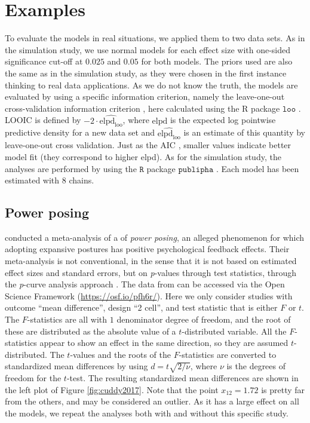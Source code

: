 \documentclass[preprint, authoryear]{elsarticle}
\theoremstyle{plain}
\theoremstyle{definition}
\begin{document}
\section{Examples}\label{sect:examples}
To evaluate the models in real situations, we applied them to two data sets. As in the simulation study, we use normal models for each effect size with one-sided significance cut-off at $0.025$ and $0.05$ for both models. The priors used are also the same as in the simulation study, as they were chosen in the first instance thinking to real data applications. As we do not know the truth, the models are evaluated by using a specific information criterion, namely the leave-one-out cross-validation information criterion \citet[LOOIC][]{loo_article}, here calculated using the R \citep{R} package $\mathtt{loo}$ \citep{loo}. LOOIC is defined by $-2\cdot\widehat{\text{elpd}_{\text{loo}}}$, where $\text{elpd}$ is the expected log pointwise predictive density for a new data set and $\widehat{\textrm{elpd}_{\textrm{loo}}}$ is an estimate of this quantity by leave-one-out cross validation. Just as the AIC \citep{akaike1998information}, smaller values indicate better model fit (they correspond to higher elpd). As for the simulation study, the analyses are performed by using the $\mathtt{R}$ package $\mathtt{publipha}$ \citep{publipha}. Each model has been estimated with $8$ chains.

\subsection{Power posing\label{subsec:cuddy2018}}

\citet{cuddy2018p} conducted a meta-analysis of a of \emph{power posing}, an alleged phenomenon for which adopting expansive postures has positive psychological feedback effects. Their meta-analysis is not conventional, in the sense that it is not based on estimated effect sizes and standard errors, but on \emph{p}-values through test statistics, through the \emph{p}-curve analysis approach \citep{simonsohn2014p}. The data from \citet{cuddy2018p} can be accessed via the Open Science Framework (\url{https://osf.io/pfh6r/}). Here we only consider studies with outcome ``mean difference'', design ``2 cell'', and test statistic that is either $F$ or $t$. The $F$-statistics are all with $1$ denominator degree of freedom, and the root of these are distributed as the absolute value of a $t$-distributed variable. All the $F$-statistics appear to show an effect in the same direction, so they are assumed $t$-distributed. The $t$-values and the roots of the $F$-statistics are converted to standardized mean differences by using $d = t\sqrt{2/\nu}$, where $\nu$ is the degrees of freedom for the $t$-test. The resulting standardized mean differences are shown in the left plot of Figure \ref{fig:cuddy2017}. Note that the point $x_{12} = 1.72$ is pretty far from the others, and may be considered an outlier. As it has a large effect on all the models, we repeat the analyses both with and without this specific study.
\end{document}
